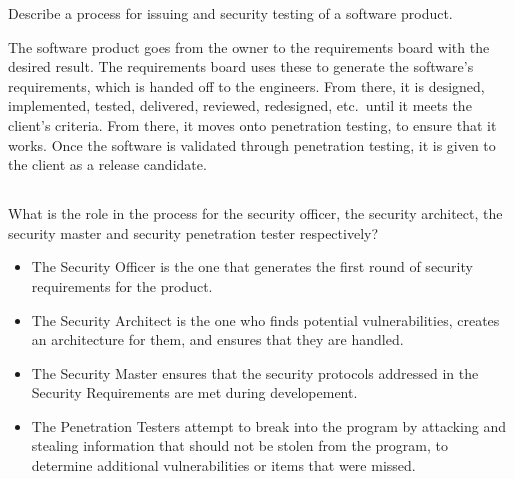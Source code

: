 \begin{questions}
\question{} Describe a process for issuing and security testing of a software product.
  \begin{solution}
    The software product goes from the owner to the requirements board with the desired result.
    The requirements board uses these to generate the software's requirements, which is handed off to the engineers.
    From there, it is designed, implemented, tested, delivered, reviewed, redesigned, etc.\ until it meets the client's criteria.
    From there, it moves onto penetration testing, to ensure that it works.
    Once the software is validated through penetration testing, it is given to the client as a release candidate.
  \end{solution}

  \begin{parts}
  \part{} What is the role in the process for the security officer, the security architect, the security master and security penetration tester respectively?
    \begin{solution}
      \begin{itemize}[noitemsep]
      \item The Security Officer is the one that generates the first round of security requirements for the product.
      \item The Security Architect is the one who finds potential vulnerabilities, creates an architecture for them, and ensures that they are handled.
      \item The Security Master ensures that the security protocols addressed in the Security Requirements are met during developement.
      \item The Penetration Testers attempt to break into the program by attacking and stealing information that should not be stolen from the program, to determine additional vulnerabilities or items that were missed.
      \end{itemize}
    \end{solution}
  \end{parts}


\end{questions}
